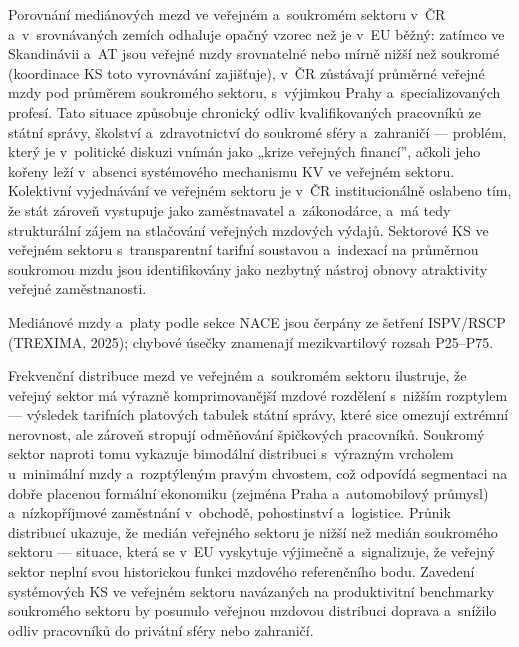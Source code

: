 Porovnání mediánových mezd ve veřejném a~soukromém sektoru v~ČR a~v~srovnávaných zemích odhaluje opačný vzorec než je v~\ac{EU} běžný: zatímco ve Skandinávii a~AT jsou veřejné mzdy srovnatelné nebo mírně nižší než soukromé (koordinace \ac{KS} toto vyrovnávání zajišťuje), v~ČR zůstávají průměrné veřejné mzdy pod průměrem soukromého sektoru, s~výjimkou Prahy a~specializovaných profesí.
Tato situace způsobuje chronický odliv kvalifikovaných pracovníků ze státní správy, školství a~zdravotnictví do soukromé sféry a~zahraničí --- problém, který je v~politické diskuzi vnímán jako „krize veřejných financí”, ačkoli jeho kořeny leží v~absenci systémového mechanismu \ac{KV} ve veřejném sektoru.
Kolektivní vyjednávání ve veřejném sektoru je v~ČR institucionálně oslabeno tím, že stát zároveň vystupuje jako zaměstnavatel a~zákonodárce, a~má tedy strukturální zájem na stlačování veřejných mzdových výdajů.
Sektorové \ac{KS} ve veřejném sektoru s~transparentní tarifní soustavou a~indexací na průměrnou soukromou mzdu jsou identifikovány jako nezbytný nástroj obnovy atraktivity veřejné zaměstnanosti.

Mediánové mzdy a~platy podle sekce \acs{NACE} jsou čerpány ze šetření \acs{ISPV}/RSCP (TREXIMA, 2025); chybové úsečky znamenají mezikvartilový rozsah P25--P75.\par

Frekvenční distribuce mezd ve veřejném a~soukromém sektoru ilustruje, že veřejný sektor má výrazně komprimovanější mzdové rozdělení s~nižším rozptylem --- výsledek tarifních platových tabulek státní správy, které sice omezují extrémní nerovnost, ale zároveň stropují odměňování špičkových pracovníků.
Soukromý sektor naproti tomu vykazuje bimodální distribuci s~výrazným vrcholem u~minimální mzdy a~rozptýleným pravým chvostem, což odpovídá segmentaci na dobře placenou formální ekonomiku (zejména Praha a~automobilový průmysl) a~nízkopříjmové zaměstnání v~obchodě, pohostinství a~logistice.
Průnik distribucí ukazuje, že medián veřejného sektoru je nižší než medián soukromého sektoru --- situace, která se v~\ac{EU} vyskytuje výjimečně a~signalizuje, že veřejný sektor neplní svou historickou funkci mzdového referenčního bodu.
Zavedení systémových \ac{KS} ve veřejném sektoru navázaných na produktivitní benchmarky soukromého sektoru by posunulo veřejnou mzdovou distribuci doprava a~snížilo odliv pracovníků do privátní sféry nebo zahraničí.\par


